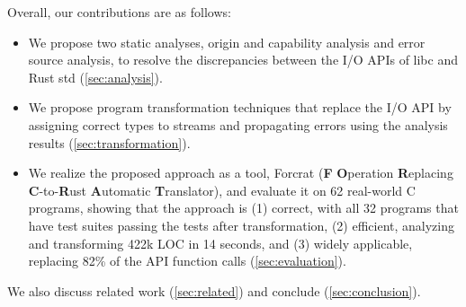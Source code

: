 Overall, our contributions are as follows:
%
\begin{itemize}
  \item
    We propose two static analyses, origin and capability analysis and error
    source analysis, to resolve the discrepancies between the I/O APIs of libc
    and Rust std (\cref{sec:analysis}).
  \item
    We propose program transformation techniques that replace the I/O API by
    assigning correct types to streams and propagating errors using the analysis
    results (\cref{sec:transformation}).
  \item
    We realize the proposed approach as a tool, Forcrat ({\bf F} {\bf
    O}peration {\bf R}eplacing {\bf C}-to-{\bf R}ust {\bf A}utomatic {\bf
    T}ranslator),
    and evaluate it on 62 real-world C programs, showing that the approach is
    (1) correct, with all 32 programs that have test suites passing the tests
    after transformation,
    (2) efficient, analyzing and transforming 422k LOC in 14 seconds, and
    (3) widely applicable, replacing 82\% of the API function calls
    (\cref{sec:evaluation}).
\end{itemize}
%
We also discuss related work (\cref{sec:related}) and conclude
(\cref{sec:conclusion}).
